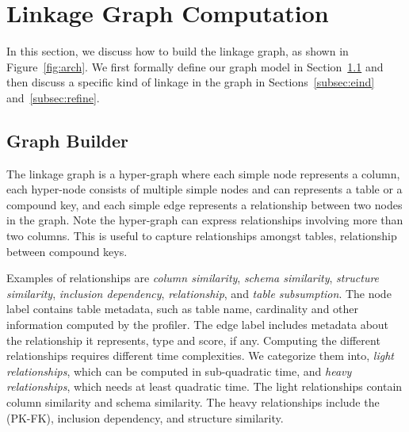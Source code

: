 \section{Linkage Graph Computation}
\label{sec:stitching}

In this section, we discuss how to build the linkage graph, as shown in Figure~\ref{fig:arch}. We first formally define our graph model in Section~\ref{subsec:graphbuild} and then discuss a specific kind of linkage in the graph in Sections~\ref{subsec:eind} and~\ref{subsec:refine}.

\subsection{Graph Builder}
\label{subsec:graphbuild}

The linkage graph is a hyper-graph where each simple node represents a column, each hyper-node consists of multiple simple nodes and can represents a table or a compound key, and each simple edge represents a relationship between two nodes in the graph. Note the hyper-graph can express relationships involving more than two columns. This is useful to capture relationships amongst tables, \eg \pkfk relationship between compound keys.

Examples of relationships are 
\emph{column similarity}, 
\emph{schema similarity}, 
\emph{structure similarity}, %
\emph{inclusion dependency}, 
\emph{\pkfk relationship}, and
\emph{table subsumption}. 
The node label contains table metadata, such as table name, cardinality and
other information computed by the profiler. The edge label includes metadata
about the relationship it represents, \eg type and score, if any. Computing
the different relationships requires different time complexities. We 
categorize them into, \textit{light relationships}, which can be computed in
sub-quadratic time, and \textit{heavy relationships}, which needs at least
quadratic time. The light relationships contain column similarity and schema
similarity. The heavy relationships include the \pkfk (PK-FK), inclusion dependency, and structure similarity. 

